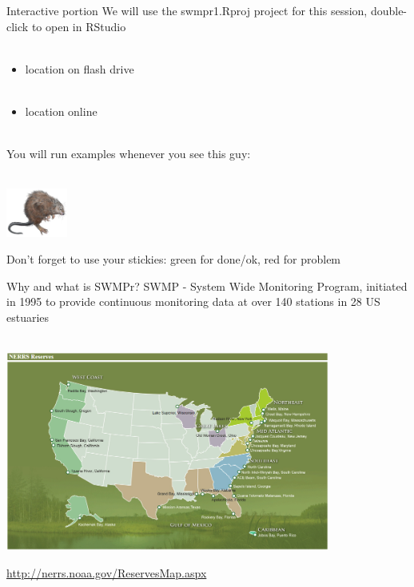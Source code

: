 \documentclass[xcolor=dvipsnames]{beamer}\usepackage[]{graphicx}\usepackage[]{color}
\begin{document}
\begin{frame}{Interactive portion}
\onslide<+->
We will use the swmpr1.Rproj project for this session, double-click to open in RStudio \\~\\
\begin{itemize}
\item location on flash drive\\~\\
\item location online \\~\\
\end{itemize}
\onslide<+->
You will run examples whenever you see this guy: \\~\\
\centerline{\includegraphics[width = 0.15\textwidth]{imgs/swmprat.png}} 
Don't forget to use your stickies: {\color{green} green} for done/ok, {\color{red} red} for problem
\end{frame}

\begin{frame}{Why and what is SWMPr?}
SWMP - System Wide Monitoring Program, initiated in 1995 to provide continuous monitoring data at over 140 stations in 28 US estuaries \\~\\
\centerline{\includegraphics[width = 0.8\textwidth]{imgs/NERRS_locations.png}}
\tiny
\flushright
\href{http://nerrs.noaa.gov/ReservesMap.aspx}{http://nerrs.noaa.gov/ReservesMap.aspx}
\end{frame}
\end{document}
